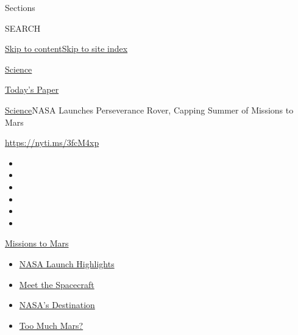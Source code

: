 Sections

SEARCH

\protect\hyperlink{site-content}{Skip to
content}\protect\hyperlink{site-index}{Skip to site index}

\href{https://www.nytimes3xbfgragh.onion/section/science}{Science}

\href{https://myaccount.nytimes3xbfgragh.onion/auth/login?response_type=cookie\&client_id=vi}{}

\href{https://www.nytimes3xbfgragh.onion/section/todayspaper}{Today's
Paper}

\href{/section/science}{Science}\textbar{}NASA Launches Perseverance
Rover, Capping Summer of Missions to Mars

\url{https://nyti.ms/3fcM4xp}

\begin{itemize}
\item
\item
\item
\item
\item
\item
\end{itemize}

\href{https://www.nytimes3xbfgragh.onion/news-event/summer-of-mars?action=click\&pgtype=Article\&state=default\&region=TOP_BANNER\&context=storylines_menu}{Missions
to Mars}

\begin{itemize}
\tightlist
\item
  \href{https://www.nytimes3xbfgragh.onion/2020/07/30/science/nasa-mars-launch.html?action=click\&pgtype=Article\&state=default\&region=TOP_BANNER\&context=storylines_menu}{NASA
  Launch Highlights}
\item
  \href{https://www.nytimes3xbfgragh.onion/interactive/2020/science/mars-perseverance-tianwen-hope.html?action=click\&pgtype=Article\&state=default\&region=TOP_BANNER\&context=storylines_menu}{Meet
  the Spacecraft}
\item
  \href{https://www.nytimes3xbfgragh.onion/2020/07/28/science/nasa-jezero-perseverance.html?action=click\&pgtype=Article\&state=default\&region=TOP_BANNER\&context=storylines_menu}{NASA's
  Destination}
\item
  \href{https://www.nytimes3xbfgragh.onion/2020/07/28/science/mars-nasa-science.html?action=click\&pgtype=Article\&state=default\&region=TOP_BANNER\&context=storylines_menu}{Too
  Much Mars?}
\end{itemize}

